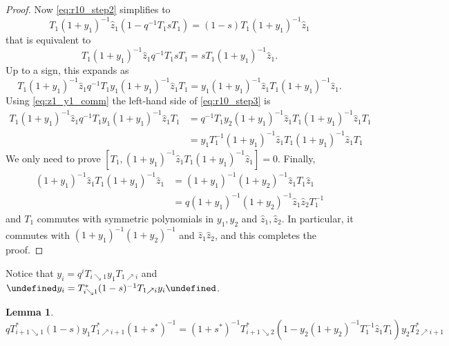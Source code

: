 \documentclass[reqno]{amsart}
\theoremstyle{plain}
\theoremstyle{definition}
\newtheorem{lemma}[theorem]{Lemma}
\theoremstyle{remark}
\newcommand{\z}{\widehat{z}}
\let\oldTheta\Theta
\let\Theta\undefined
\DeclareMathOperator{\Theta}{\oldTheta}
\newcommand{\<}{\langle}
\renewcommand{\>}{\rangle}
\begin{document}
\begin{proof}
    Now \eqref{eq:r10_step2} simplifies to
    \[ T_1 (1 + y_1)^{-1} \z_1 (1 - q^{-1} T_1 s T_1) = (1-s) T_1 (1 + y_1)^{-1} \z_1 \]
    that is equivalent to 
    \[ T_1 (1 + y_1)^{-1} \z_1 q^{-1} T_1 s T_1 = s T_1 (1 + y_1)^{-1} \z_1. \]
    Up to a sign, this expands as
    \begin{equation}
        \label{eq:r10_step3}
        T_1 (1 + y_1)^{-1} \z_1 q^{-1} T_1 y_1 (1 + y_1)^{-1} \z_1 T_1 = y_1 (1 + y_1)^{-1} \z_1 T_1 (1 + y_1)^{-1} \z_1.
    \end{equation}
    Using \eqref{eq:z1_y1_comm} the left-hand side of \eqref{eq:r10_step3} is
    \begin{align*}
        T_1 (1 + y_1)^{-1} \z_1 q^{-1} T_1 y_1 (1 + y_1)^{-1} \z_1 T_1  & = q^{-1} T_1 y_2 (1 + y_1)^{-1} \z_1  T_1  (1 + y_1)^{-1} \z_1 T_1 \\
        & = y_1 T_1^{-1} (1 + y_1)^{-1} \z_1  T_1 (1 + y_1)^{-1} \z_1 T_1
    \end{align*}
    We only need to prove $[T_1, (1 + y_1)^{-1} \z_1 T_1 (1 + y_1)^{-1} \z_1] = 0$.
    Finally,
    \begin{align*}
        (1 + y_1)^{-1} \z_1 T_1 (1 + y_1)^{-1} \z_1 &= (1 + y_1)^{-1} (1 + y_2)^{-1} \z_1 T_1 \z_1 \\
        & = q (1 + y_1)^{-1} (1 + y_2)^{-1} \z_1 \z_2 T_1^{-1}
    \end{align*}
    and $T_1$ commutes with symmetric polynomials in $y_1, y_2$ and $\z_1, \z_2$. In particular, it commutes with $(1 + y_1)^{-1} (1 + y_2)^{-1}$ and $\z_1  \z_2$, and this completes the proof.
\end{proof}

Notice that $y_i= q^i T_{i \searrow 1} y_1  T_{1 \nearrow i}$ and $\Theta y_i = T_{i \searrow 1}^* (1-s)^{-1} T_{1 \nearrow i} y_i \Theta$.

\begin{lemma}
    \label{lemma:proof_r10*}
    \[ qT^*_{i+1 \searrow 1} (1-s) y_1 T^*_{1 \nearrow i+1} (1+s^*)^{-1} = (1+s^*)^{-1} T^*_{i+1 \searrow 2} \left( 1 - y_2 (1 + y_2)^{-1} T_1^{-1} \z_1 T_1 \right) y_2 T^*_{2 \nearrow i+1}\]
\end{lemma}
\end{document}
